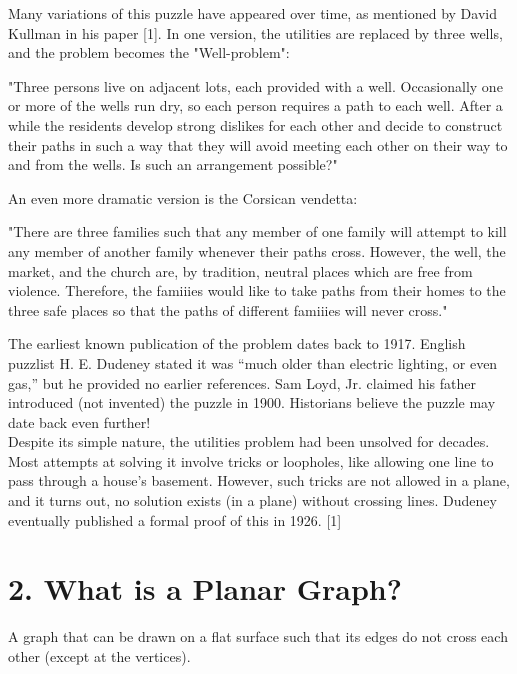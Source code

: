 \documentclass[12pt]{exam}
\begin{document}
Many variations of this puzzle have appeared over time, as mentioned by David Kullman in his paper [1]. In one version, the utilities are replaced by three wells, and the problem becomes the "Well-problem":
\begin{center}
    "Three persons live on adjacent lots, each provided with a well. Occasionally one or more of the wells run dry, so each person requires a path to each well. After a while the residents develop strong dislikes for each other and decide to construct their paths in such a way that they will avoid meeting each other on their way to and from the wells. Is such an arrangement possible?"
\end{center}

An even more dramatic version is the Corsican vendetta:

\begin{center}
    "There are three families such that any member of one family will attempt to kill any member of another family whenever their paths cross. However, the well, the market, and the church are, by tradition, neutral places which are free from violence. Therefore, the famiiies would like to take paths from their homes to the three safe places so that the paths of different famiiies will never cross."
\end{center}

The earliest known publication of the problem dates back to 1917. English puzzlist H. E. Dudeney stated it was “much older than electric lighting, or even gas,” but he provided no earlier references. Sam Loyd, Jr. claimed his father introduced (not invented) the puzzle in 1900. Historians believe the puzzle may date back even further!\\

Despite its simple nature, the utilities problem had been unsolved for decades. Most attempts at solving it involve tricks or loopholes, like allowing one line to pass through a house's basement. However, such tricks are not allowed in a plane, and it turns out, no solution exists (in a plane) without crossing lines. Dudeney eventually published a formal proof of this in 1926. [1]

\section*{2. What is a Planar Graph?}
A graph that can be drawn on a flat surface such that its edges do not cross each other (except at the vertices).\\
\end{document}
